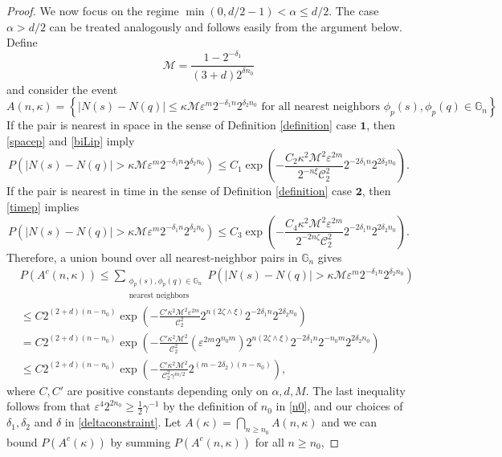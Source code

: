 \documentclass[12pt]{amsart}
\numberwithin{equation}{section}
\newcommand{\1}{\mathbf{1}}
\begin{document}
\begin{proof}
We now focus on the regime $\min(0,d/2-1)<\alpha\leq d/2$. The case $\alpha>d/2$ can be treated analogously and follows easily from the argument below. Define
\begin{equation}
\label{M}
\mathcal{M}=\frac{1-2^{-\delta_1}}{(3+d)2^{\delta n_0}}
\end{equation}
and consider the event
\[A(n,\kappa)=\left\lbrace\vert N(s)-N(q)\vert\leq \kappa \mathcal{M}\varepsilon^{m} 2^{-\delta_1n}2^{\delta_2n_0}\text{ for all nearest neighbors $\phi_p(s),\phi_p(q)\in \mathbb{G}_n$}\right\rbrace.\]
If the pair is nearest in space in the sense of Definition \ref{definition} case $\textbf{1}$, then \eqref{spacep} and \eqref{biLip} imply
\[P\left(\vert N(s)-N(q)\vert> \kappa \mathcal{M}\varepsilon^{m} 2^{-\delta_1n}2^{\delta_2n_0}\right)\leq C_1\exp\left(-\frac{C_2\kappa^2\mathcal{M}^2\varepsilon^{2m}}{2^{-n\xi}\mathcal{C}_2^2}2^{-2\delta_1n}2^{2\delta_2n_0}\right).\]
If the pair is nearest in time in the sense of Definition \ref{definition} case $\textbf{2}$, then \eqref{timep} implies
\[P\left(\vert N(s)-N(q)\vert> \kappa \mathcal{M}\varepsilon^{m}2^{-\delta_1n}2^{\delta_2n_0}\right)\leq C_3\exp\left(-\frac{C_4\kappa^2\mathcal{M}^2\varepsilon^{2m}}{2^{-2n\zeta}\mathcal{C}_2^2}2^{-2\delta_1n}2^{2\delta_2n_0}\right).\]
Therefore, a union bound over all nearest-neighbor pairs in $\mathbb{G}_n$ gives
\begin{align*}
&P(A^c(n,\kappa))\leq \sum_{\substack{\phi_p(s),\phi_p(q)\in \mathbb{G}_n\\ \text{nearest neighbors}}}P\left(\vert N(s)-N(q)\vert> \kappa \mathcal{M}\varepsilon^{m} 2^{-\delta_1n}2^{\delta_2n_0}\right)\\
&\leq C2^{(2+d)(n-n_0)}\exp\left(-\frac{C'\kappa^2\mathcal{M}^2\varepsilon^{2m}}{\mathcal{C}_2^2}2^{n(2\zeta\wedge \xi)}2^{-2\delta_1n}2^{2\delta_2n_0}\right)\\
&=C2^{(2+d)(n-n_0)}\exp\left(-\frac{C'\kappa^2\mathcal{M}^2}{\mathcal{C}_2^2}\left(\varepsilon^{2m} 2^{n_0m}\right)2^{n(2\zeta\wedge\xi)}2^{-2\delta_1n}2^{-n_0m}2^{2\delta_2n_0}\right)\\
&\leq C2^{(2+d)(n-n_0)}\exp\left(-\frac{C'\kappa^2\mathcal{M}^2}{\mathcal{C}_2^2\gamma^{m/2}}2^{(m-2\delta_2)(n-n_0)}\right),
\end{align*}
where $C,C'$ are positive constants depending only on $\alpha,d,M$. The last inequality follows from that $\varepsilon^{4} 2^{2n_0}\geq\frac{1}{2}\gamma^{-1}$ by the definition of $n_0$ in \eqref{n0}, and our choices of $\delta_1,\delta_2$ and $\delta$ in \eqref{deltaconstraint}. Let $A(\kappa)=\bigcap\limits_{n\geq n_0}A(n,\kappa)$ and we can bound $P(A^c(\kappa))$ by summing $P(A^c(n,\kappa))$ for all $n\geq n_0$,

\end{proof}
\end{document}
